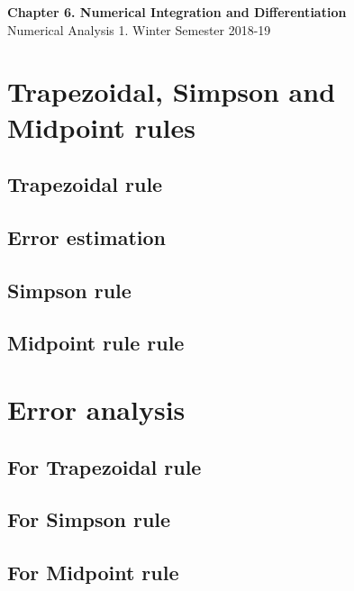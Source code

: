 \documentclass[12pt]{article}
\theoremstyle{theorem}
\begin{document}

\thispagestyle{empty}

\begin{center}
	{\LARGE \bf Chapter 6. Numerical Integration and Differentiation } \\[.2cm]
	{\large Numerical Analysis 1. Winter Semester 2018-19}
\end{center}

\section{Trapezoidal, Simpson and Midpoint rules}

\subsection{Trapezoidal rule}

\subsection{Error estimation}

\subsection{Simpson rule}

\subsection{Midpoint rule rule}

\section{Error analysis}

\subsection{For Trapezoidal rule}

\subsection{For Simpson rule}

\subsection{For Midpoint rule}

\cleardoublepage 
\end{document}
